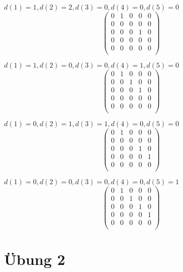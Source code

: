 \documentclass[10pt,a4paper]{article}
\begin{document}
$d(1) = 1, d(2) = 2, d(3) = 0, d(4) = 0, d(5) = 0$
\begin{equation}
\begin{pmatrix}
0 & 1 & 0 & 0 & 0\\
0 & 0 & 0 & 0 & 0\\
0 & 0 & 0 & 1 & 0\\
0 & 0 & 0 & 0 & 0\\
0 & 0 & 0 & 0 & 0\\
\end{pmatrix}
\end{equation}

$d(1) = 1, d(2) = 0, d(3) = 0, d(4) = 1, d(5) = 0$
\begin{equation}
\begin{pmatrix}
0 & 1 & 0 & 0 & 0\\
0 & 0 & 1 & 0 & 0\\
0 & 0 & 0 & 1 & 0\\
0 & 0 & 0 & 0 & 0\\
0 & 0 & 0 & 0 & 0\\
\end{pmatrix}
\end{equation}

$d(1) = 0, d(2) = 1, d(3) = 1, d(4) = 0, d(5) = 0$
\begin{equation}
\begin{pmatrix}
0 & 1 & 0 & 0 & 0\\
0 & 0 & 0 & 0 & 0\\
0 & 0 & 0 & 1 & 0\\
0 & 0 & 0 & 0 & 1\\
0 & 0 & 0 & 0 & 0\\
\end{pmatrix}
\end{equation}

$d(1) = 0, d(2) = 0, d(3) = 0, d(4) = 0, d(5) = 1$
\begin{equation}
\begin{pmatrix}
0 & 1 & 0 & 0 & 0\\
0 & 0 & 1 & 0 & 0\\
0 & 0 & 0 & 1 & 0\\
0 & 0 & 0 & 0 & 1\\
0 & 0 & 0 & 0 & 0\\
\end{pmatrix}
\end{equation}

\section*{Übung 2}
\end{document}
